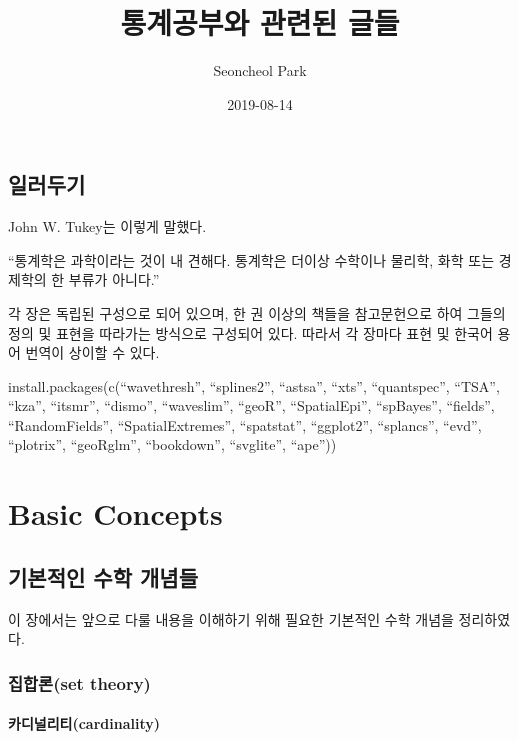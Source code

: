 \documentclass[b5paper,]{scrbook}
\title{통계공부와 관련된 글들}
\author{Seoncheol Park}
\date{2019-08-14}
\theoremstyle{plain}
\theoremstyle{definition}
\numberwithin{equation}{section}
\begin{document}
\maketitle

{
\hypersetup{linkcolor=Black}
\setcounter{tocdepth}{2}
\tableofcontents
}
\chapter{일러두기}

John W. Tukey는 이렇게 말했다.

``통계학은 과학이라는 것이 내 견해다. 통계학은 더이상 수학이나 물리학, 화학 또는 경제학의 한 부류가 아니다.''

각 장은 독립된 구성으로 되어 있으며, 한 권 이상의 책들을 참고문헌으로 하여 그들의 정의 및 표현을 따라가는 방식으로 구성되어 있다. 따라서 각 장마다 표현 및 한국어 용어 번역이 상이할 수 있다.

install.packages(c(``wavethresh'', ``splines2'', ``astsa'', ``xts'', ``quantspec'', ``TSA'', ``kza'', ``itsmr'', ``dismo'', ``waveslim'', ``geoR'', ``SpatialEpi'', ``spBayes'', ``fields'', ``RandomFields'', ``SpatialExtremes'', ``spatstat'', ``ggplot2'', ``splancs'', ``evd'', ``plotrix'', ``geoRglm'', ``bookdown'', ``svglite'', ``ape''))

\mainmatter

\hypertarget{part-basic-concepts}{%
\part{Basic Concepts}\label{part-basic-concepts}}

\hypertarget{math}{%
\chapter{기본적인 수학 개념들}\label{math}}

이 장에서는 앞으로 다룰 내용을 이해하기 위해 필요한 기본적인 수학 개념을 정리하였다.

\hypertarget{set-theory}{%
\section{집합론(set theory)}\label{set-theory}}

\hypertarget{cardinality}{%
\subsection{카디널리티(cardinality)}\label{cardinality}}
\end{document}
